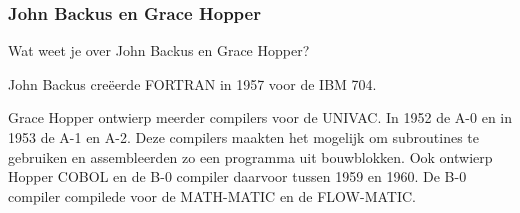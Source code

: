 \documentclass[../main.tex]{subfiles}
\begin{document}
\subsubsection{John Backus en Grace Hopper}
\begin{question}
Wat weet je over John Backus en Grace Hopper?
\end{question}
\begin{solution}
John Backus cre\"eerde FORTRAN in 1957 voor de IBM 704.

Grace Hopper ontwierp meerder compilers voor de UNIVAC.
In 1952 de A-0 en in 1953 de A-1 en A-2.
Deze compilers maakten het mogelijk om subroutines te gebruiken en assembleerden zo een programma uit bouwblokken.
Ook ontwierp Hopper COBOL en de B-0 compiler daarvoor tussen 1959 en 1960.
De B-0 compiler compilede voor de MATH-MATIC en de FLOW-MATIC.
\end{solution}
\end{document}
